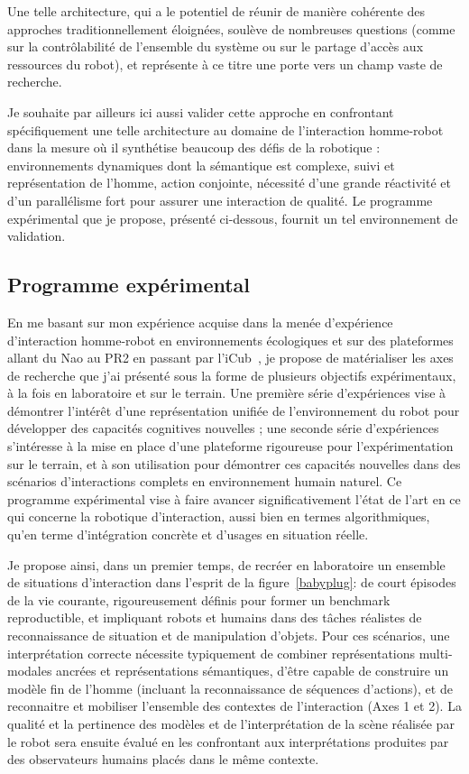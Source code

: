 \documentclass[a4paper]{article}
\begin{document}
Une telle architecture, qui a le potentiel de réunir de manière cohérente des
approches traditionnellement éloignées, soulève de nombreuses questions (comme
sur la contrôlabilité de l'ensemble du système ou sur le partage d'accès aux
ressources du robot), et représente à ce titre une porte vers un champ vaste de
recherche.

Je souhaite par ailleurs ici aussi valider cette approche en confrontant
spécifiquement une telle architecture au domaine de l'interaction homme-robot
dans la mesure où il synthétise beaucoup des défis de la robotique :
environnements dynamiques dont la sémantique est complexe, suivi et
représentation de l'homme, action conjointe, nécessité d'une grande réactivité
et d'un parallélisme fort pour assurer une interaction de qualité. Le programme
expérimental que je propose, présenté ci-dessous, fournit un tel environnement
de validation.

\subsection*{Programme expérimental}

En me basant sur mon expérience acquise dans la menée d'expérience d'interaction
homme-robot en environnements écologiques et sur des plateformes allant du Nao
au PR2 en passant par
l'iCub~\cite{lemaignan2010oro,ros2010which,lallee2011towards,lemaignan2012roboscopie,warnier2012when,hood2015when},
je propose de matérialiser les axes de recherche que j'ai présenté sous la forme
de plusieurs objectifs expérimentaux, à la fois en laboratoire et sur le
terrain.  Une première série d'expériences vise à démontrer l'intérêt d'une
représentation unifiée de l'environnement du robot pour développer des capacités
cognitives nouvelles ; une seconde série d'expériences s'intéresse à la mise en
place d'une plateforme rigoureuse pour l'expérimentation sur le terrain, et à
son utilisation pour démontrer ces capacités nouvelles dans des scénarios
d'interactions complets en environnement humain naturel. Ce programme
expérimental vise à faire avancer significativement l'état de l'art en ce qui
concerne la robotique d'interaction, aussi bien en termes algorithmiques, qu'en
terme d'intégration concrète et d'usages en situation réelle.

Je propose ainsi, dans un premier temps, de recréer en laboratoire un ensemble
de situations d'interaction dans l'esprit de la figure~\ref{babyplug}: de court
épisodes de la vie courante, rigoureusement définis pour former un benchmark
reproductible, et impliquant robots et humains dans des tâches réalistes de
reconnaissance de situation et de manipulation d'objets. Pour ces scénarios, une
interprétation correcte nécessite typiquement de combiner représentations
multi-modales ancrées et représentations sémantiques, d'être capable de
construire un modèle fin de l'homme (incluant la reconnaissance de séquences
d'actions), et de reconnaitre et mobiliser l'ensemble des contextes de
l'interaction (Axes 1 et 2). La qualité et la pertinence des modèles et de
l'interprétation de la scène réalisée par le robot sera ensuite évalué en les
confrontant aux interprétations produites par des observateurs humains placés
dans le même contexte.
\end{document}
